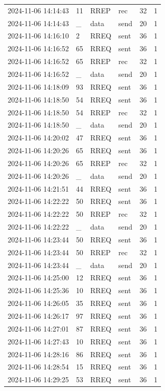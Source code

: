 \documentclass[]{nsm-thesis}
\begin{document}
\begin{longtable}{llllll}
2024-11-06 14:14:43 & 11 & RREP & rec & 32 & 1 \\
2024-11-06 14:14:43 & _ & data & send & 20 & 1 \\
2024-11-06 14:16:10 & 2 & RREQ & sent & 36 & 1 \\
2024-11-06 14:16:52 & 65 & RREQ & sent & 36 & 1 \\
2024-11-06 14:16:52 & 65 & RREP & rec & 32 & 1 \\
2024-11-06 14:16:52 & _ & data & send & 20 & 1 \\
2024-11-06 14:18:09 & 93 & RREQ & sent & 36 & 1 \\
2024-11-06 14:18:50 & 54 & RREQ & sent & 36 & 1 \\
2024-11-06 14:18:50 & 54 & RREP & rec & 32 & 1 \\
2024-11-06 14:18:50 & _ & data & send & 20 & 1 \\
2024-11-06 14:20:02 & 47 & RREQ & sent & 36 & 1 \\
2024-11-06 14:20:26 & 65 & RREQ & sent & 36 & 1 \\
2024-11-06 14:20:26 & 65 & RREP & rec & 32 & 1 \\
2024-11-06 14:20:26 & _ & data & send & 20 & 1 \\
2024-11-06 14:21:51 & 44 & RREQ & sent & 36 & 1 \\
2024-11-06 14:22:22 & 50 & RREQ & sent & 36 & 1 \\
2024-11-06 14:22:22 & 50 & RREP & rec & 32 & 1 \\
2024-11-06 14:22:22 & _ & data & send & 20 & 1 \\
2024-11-06 14:23:44 & 50 & RREQ & sent & 36 & 1 \\
2024-11-06 14:23:44 & 50 & RREP & rec & 32 & 1 \\
2024-11-06 14:23:44 & _ & data & send & 20 & 1 \\
2024-11-06 14:25:00 & 12 & RREQ & sent & 36 & 1 \\
2024-11-06 14:25:36 & 10 & RREQ & sent & 36 & 1 \\
2024-11-06 14:26:05 & 35 & RREQ & sent & 36 & 1 \\
2024-11-06 14:26:17 & 97 & RREQ & sent & 36 & 1 \\
2024-11-06 14:27:01 & 87 & RREQ & sent & 36 & 1 \\
2024-11-06 14:27:43 & 10 & RREQ & sent & 36 & 1 \\
2024-11-06 14:28:16 & 86 & RREQ & sent & 36 & 1 \\
2024-11-06 14:28:54 & 15 & RREQ & sent & 36 & 1 \\
2024-11-06 14:29:25 & 53 & RREQ & sent & 36 & 1 \\
\bottomrule
\end{longtable}
\end{document}
